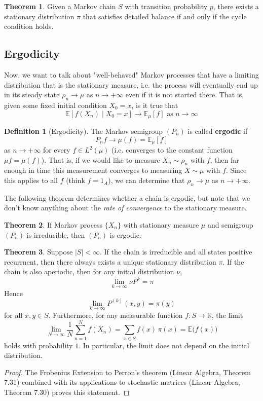 \documentclass{article}
\theoremstyle{definition}
\newtheorem{theorem}{Theorem}[section]
\theoremstyle{remark}
\theoremstyle{definition}
\newtheorem{definition}{Definition}[section]
\begin{document}
\begin{theorem}
Given a Markov chain $S$ with transition probability $p$, there exists a stationary distribution $\pi$ that satisfies detailed balance if and only if the cycle condition holds. 
\end{theorem}

\subsection{Ergodicity}

Now, we want to talk about "well-behaved" Markov processes that have a limiting distribution that is the stationary measure, i.e. the process will eventually end up in its steady state $\rho_n \rightarrow \mu$ as $n \rightarrow +\infty$ even if it is not started there. That is, given some fixed initial condition $X_0 = x$, is it true that 
\[\mathbb{E}[f(X_n) \mid X_0 = x] \rightarrow \mathbb{E}_\mu [f] \text{ as } n \rightarrow \infty\]

\begin{definition}[Ergodicity]
The Markov semigroup $(P_n)$ is called \textbf{ergodic} if 
\[P_n f \rightarrow \mu(f) = \mathbb{E}_\mu [f]\]
as $n \rightarrow +\infty$ for every $f \in L^2 (\mu)$ (i.e. converges to the constant function $\mu f = \mu(f)$). That is, if we would like to measure $X_n \sim \rho_n$ with $f$, then far enough in time this measurement converges to measuring $X \sim \mu$ with $f$. Since this applies to all $f$ (think $f = 1_A$), we can determine that $\rho_n \rightarrow \mu$ as $n \rightarrow +\infty$. 
\end{definition}

The following theorem determines whether a chain is ergodic, but note that we don't know anything about the \textit{rate of convergence} to the stationary measure. 

\begin{theorem}
If Markov process $\{X_n\}$ with stationary measure $\mu$ and semigroup $(P_n)$ is irreducible, then $(P_n)$ is ergodic. 
\end{theorem}

\begin{theorem}
Suppose $|S| < \infty$. If the chain is irreducible and all states positive recurrnent, then there always exists a unique stationary distribution $\pi$. If the chain is also aperiodic, then for any initial distribution $\nu$, 
\[\lim_{k \rightarrow \infty} \nu P^k = \pi \]
Hence
\[\lim_{k \rightarrow \infty} P^{(k)}(x, y) = \pi(y)\]
for all $x, y \in S$. Furthermore, for any measurable function $f: S \longrightarrow \mathbb{R}$, the limit 
\[\lim_{N \rightarrow \infty} \frac{1}{N} \sum_{n=1}^N f(X_n) = \sum_{x \in S} f(x)\, \pi(x) = \mathbb{E} \big( f(x) \big)\]
holds with probability $1$. In particular, the limit does not depend on the initial distribution. 
\end{theorem}
\begin{proof}
The Frobenius Extension to Perron's theorem (Linear Algebra, Theorem 7.31) combined with its applications to stochastic matrices (Linear Algebra, Theorem 7.30) proves this statement. 
\end{proof}
\end{document}
